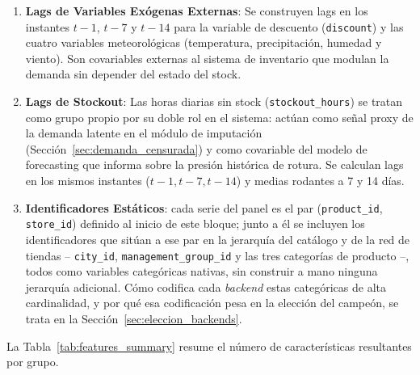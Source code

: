 \begin{enumerate}
    \item \textbf{Lags de Variables Exógenas Externas}: Se construyen lags en los instantes $t-1$, $t-7$ y $t-14$ para la variable de descuento (\texttt{discount}) y las cuatro variables meteorológicas (temperatura, precipitación, humedad y viento). Son covariables externas al sistema de inventario que modulan la demanda sin depender del estado del stock.

    \item \textbf{Lags de Stockout}: Las horas diarias sin stock (\texttt{stockout\_hours}) se tratan como grupo propio por su doble rol en el sistema: actúan como señal proxy de la demanda latente en el módulo de imputación (Sección~\ref{sec:demanda_censurada}) y como covariable del modelo de forecasting que informa sobre la presión histórica de rotura. Se calculan lags en los mismos instantes ($t-1, t-7, t-14$) y medias rodantes a 7 y 14 días.

    \item \textbf{Identificadores Estáticos}: cada serie del panel es el par (\texttt{product\_id}, \texttt{store\_id}) definido al inicio de este bloque; junto a él se incluyen los identificadores que sitúan a ese par en la jerarquía del catálogo y de la red de tiendas -- \texttt{city\_id}, \texttt{management\_group\_id} y las tres categorías de producto --, todos como variables categóricas nativas, sin construir a mano ninguna jerarquía adicional. Cómo codifica cada \textit{backend} estas categóricas de alta cardinalidad, y por qué esa codificación pesa en la elección del campeón, se trata en la Sección~\ref{sec:eleccion_backends}.
\end{enumerate}

La Tabla~\ref{tab:features_summary} resume el número de características resultantes por grupo.

